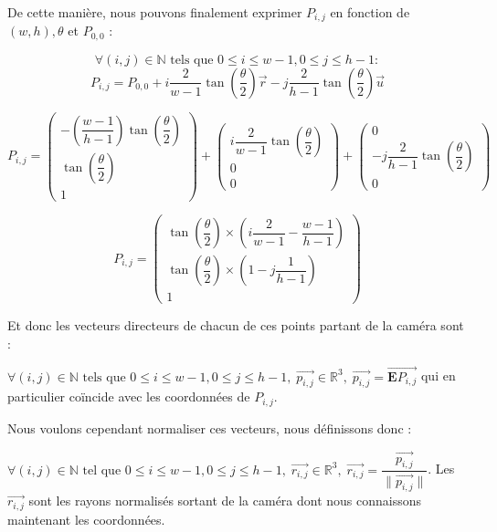 De cette manière, nous pouvons finalement exprimer $P_{i,j}$ en fonction de $(w,h), \theta$ et $P_{0,0}$ :

$$\forall (i,j) \in \mathbb{N} \text{ tels que } 0\leq i\leq w-1, 0\leq j\leq h-1 :$$
$$P_{i,j}=P_{0,0}+i\dfrac{2}{w-1}\tan(\dfrac{\theta}{2})\vec{r}-j\dfrac{2}{h-1}\tan(\dfrac{\theta}{2})\vec{u}$$

$$P_{i,j}=\begin{pmatrix} -(\dfrac{w-1}{h-1})\tan(\dfrac{\theta}{2})\\[1ex] \tan(\dfrac{\theta}{2})\\[1ex] 1 \end{pmatrix} + \begin{pmatrix} i\dfrac{2}{w-1}\tan(\dfrac{\theta}{2})\\[1.3ex]0\\0 \end{pmatrix} + \begin{pmatrix} 0\\-j\dfrac{2}{h-1}\tan(\dfrac{\theta}{2})\\[1.3ex]0 \end{pmatrix}$$

$$P_{i,j}=\begin{pmatrix} \tan(\dfrac{\theta}{2})\times(i\dfrac{2}{w-1}-\dfrac{w-1}{h-1}) \\ \tan(\dfrac{\theta}{2})\times(1-j\dfrac{1}{h-1}) \\ 1 \end{pmatrix}$$

Et donc les vecteurs directeurs de chacun de ces points partant de la caméra sont :

$\forall (i,j) \in \mathbb{N} \text{ tels que } 0\leq i\leq w-1, 0\leq j\leq h-1, \; \vec{p_{i,j}} \in \mathbb{R}^3, \; \vec{p_{i,j}}=\overrightarrow{\mathbf{E}P_{i,j}}$ qui en particulier coïncide avec les coordonnées de $P_{i,j}$.

Nous voulons cependant normaliser ces vecteurs, nous définissons donc :

$\forall (i,j) \in \mathbb{N} \text{ tel que } 0\leq i\leq w-1, 0\leq j\leq h-1, \; \vec{r_{i,j}} \in \mathbb{R}^3, \; \vec{r_{i,j}}=\dfrac{\vec{p_{i,j}}}{\lVert \vec{p_{i,j}} \rVert}$. Les $\vec{r_{i,j}}$ sont les rayons normalisés sortant de la caméra dont nous connaissons maintenant les coordonnées.

\pagebreak